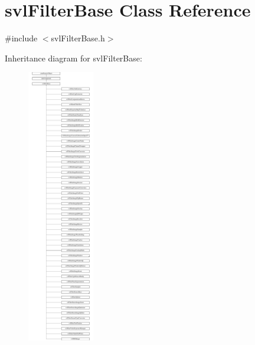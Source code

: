 \hypertarget{classsvl_filter_base}{\section{svl\-Filter\-Base Class Reference}
\label{classsvl_filter_base}
}


{\ttfamily \#include $<$svl\-Filter\-Base.\-h$>$}

Inheritance diagram for svl\-Filter\-Base\-:\begin{figure}[H]
\begin{center}
\leavevmode
\includegraphics[height=12.000000cm]{de/d68/classsvl_filter_base}
\end{center}
\end{figure}
